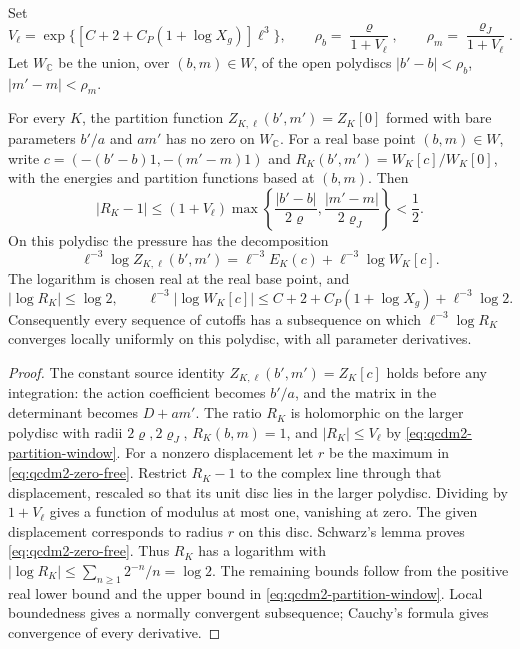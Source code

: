 \documentclass[11pt,letterpaper,reqno]{amsart}
\makeatletter
\theoremstyle{definition}
\newcommand{\ms@minorstart}{%
  \pushQED{\qed}\renewcommand{\qedsymbol}{$\blacksquare$}}
\newenvironment{proposition}[1][]{\ms@minorstart\ms@proposition[#1]}
  {\popQED\endms@proposition}
\theoremstyle{remark}
\makeatother
\begin{document}
Set
\begin{equation}\label{eq:qcdm2-analytic-radii}
 V_\ell=\exp\{[C+2+C_P(1+\log X_g)]\ell^3\},\qquad
 \rho_b=\frac{\varrho}{1+V_\ell},\qquad
 \rho_m=\frac{\varrho_J}{1+V_\ell}.
\end{equation}
Let $W_{\mathbb C}$ be the union, over $(b,m)\in W$, of the
open polydiscs $|b'-b|<\rho_b$, $|m'-m|<\rho_m$.

\begin{proposition}[Complex parameters]\label{C-403-41}
For every $K$, the partition function
$Z_{K,\ell}(b',m')=Z_K[0]$ formed with bare parameters
$b'/a$ and $am'$ has no zero on $W_{\mathbb C}$.
For a real base point $(b,m)\in W$, write
$c=(- (b'-b)1,-(m'-m)1)$ and
$R_K(b',m')=W_K[c]/W_K[0]$, with the energies and partition
functions based at $(b,m)$. Then
\begin{equation}\label{eq:qcdm2-zero-free}
 |R_K-1|\le(1+V_\ell)
 \max\left\{\frac{|b'-b|}{2\varrho},
             \frac{|m'-m|}{2\varrho_J}\right\}<\frac12.
\end{equation}
On this polydisc the pressure has the decomposition
\[
 \ell^{-3}\log Z_{K,\ell}(b',m')
=\ell^{-3}E_K(c)+\ell^{-3}\log W_K[c].
\]
The logarithm is chosen real at the real base point, and
\[
 |\log R_K|\le\log2,\qquad
 \ell^{-3}|\log W_K[c]|
 \le C+2+C_P(1+\log X_g)+\ell^{-3}\log2.
\]
Consequently every sequence of cutoffs has a subsequence on
which $\ell^{-3}\log R_K$ converges locally uniformly on this
polydisc, with all parameter derivatives.
\end{proposition}

\begin{proof}
The constant source identity
$Z_{K,\ell}(b',m')=Z_K[c]$ holds before any integration:
the action coefficient becomes $b'/a$, and the matrix in the
determinant becomes $D+am'$. The ratio $R_K$ is holomorphic on
the larger polydisc with radii $2\varrho,2\varrho_J$,
$R_K(b,m)=1$, and $|R_K|\le V_\ell$ by
\eqref{eq:qcdm2-partition-window}.
For a nonzero displacement let $r$ be the maximum in
\eqref{eq:qcdm2-zero-free}. Restrict $R_K-1$ to the complex
line through that displacement, rescaled so that its unit
disc lies in the larger polydisc. Dividing by $1+V_\ell$
gives a function of modulus at most one, vanishing at zero.
The given displacement corresponds to radius $r$ on this
disc. Schwarz's lemma proves
\eqref{eq:qcdm2-zero-free}. Thus $R_K$ has a logarithm with
$|\log R_K|\le\sum_{n\ge1}2^{-n}/n=\log2$.
The remaining bounds follow from the positive real lower
bound and the upper bound in \eqref{eq:qcdm2-partition-window}.
Local boundedness gives a normally convergent subsequence;
Cauchy's formula gives convergence of every derivative.
\end{proof}
\end{document}
